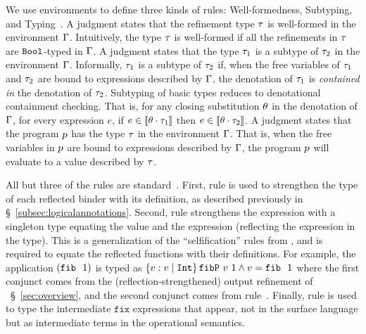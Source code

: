 We use environments to define three kinds of
rules: Well-formedness, Subtyping,
and Typing~\citep{Knowles10,Vazou14}.
%
A judgment \iswellformed{\env}{\typ} states that
the refinement type $\tau$ is well-formed in
the environment $\Gamma$.
%
Intuitively, the type $\tau$ is well-formed if all
the refinements in $\tau$ are $\texttt{Bool}$-typed in $\Gamma$.
%
A judgment  states
that the type $\tau_1$ is a subtype of %
$\tau_2$ in the environment $\Gamma$.
%
Informally, $\tau_1$ is a subtype of $\tau_2$ if, when
the free variables of $\tau_1$ and $\tau_2$
are bound to expressions described by $\Gamma$,
the denotation of $\tau_1$
is \emph{contained in} the denotation of $\tau_2$.
%
Subtyping of basic types reduces to denotational containment checking.
%
%
That is, for any closing substitution $\theta$
in the denotation of $\Gamma$, for every expression $e$,
if $e \in \interp{\applysub{\sto}{\typ_1}}$ then
$ e \in \interp{\applysub{\sto}{\typ_2}}$.
%
A judgment \hastype{\env}{\prog}{\typ} states that
the program $p$ has the type $\tau$ in
the environment $\Gamma$.
That is, when the free variables in $p$ are
bound to expressions described by $\Gamma$, the
program $p$ will evaluate to a value
described by $\tau$.

%
All but three of the rules are standard~\cite{Knowles10,Vazou14}.
%
First, rule \rtreflect is used to strengthen the type of each
reflected binder with its definition, as described previously
in \S~\ref{subsec:logicalannotations}.
%
Second, rule \rtexact strengthens the expression with
a singleton type equating the value and the expression
(\ie reflecting the expression in the type).
%
This is a generalization of the ``selfification'' rules
from \cite{Ou2004,Knowles10}, and is required to
equate the reflected functions with their definitions.
%
For example, the application $(\texttt{fib}\ {\ }1)$ is typed as
${\tref{v}{\tint}{\fibdef\ v\ 1 \wedge v = \fib\ 1}}$ where
the first conjunct comes from the (reflection-strengthened)
output refinement of \fib~\S~\ref{sec:overview}, and
the second conjunct comes from rule~\rtexact.
%
Finally, rule \rtfix is used to type the intermediate
$\texttt{fix}$ expressions that appear, not in the
surface language but as intermediate terms in the
operational semantics.

